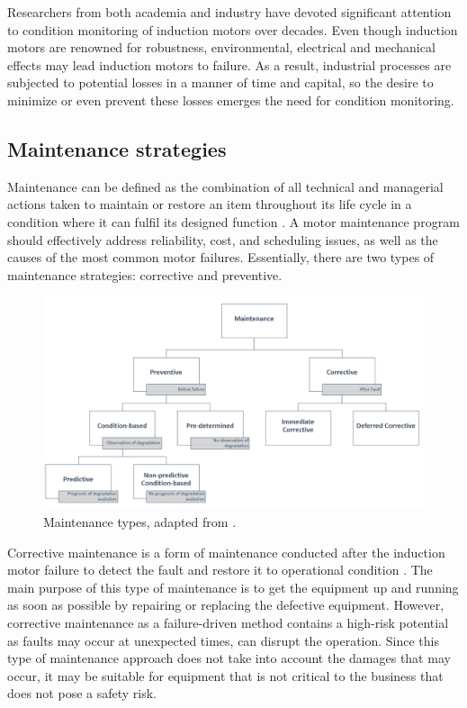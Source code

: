 Researchers from both academia and industry have devoted significant attention to condition monitoring of induction motors over decades. Even though induction motors are renowned for robustness, environmental, electrical and mechanical effects may lead induction motors to failure. As a result, industrial processes are subjected to potential losses in a manner of time and capital, so the desire to minimize or even prevent these losses emerges the need for condition monitoring. 
\pagebreak
\subsection{Maintenance strategies}

Maintenance can be defined as the combination of all technical and managerial actions taken to maintain or restore an item throughout its life cycle in a condition where it can fulfil its designed function \cite{en201713306}. A motor maintenance program should effectively address reliability, cost, and scheduling issues, as well as the causes of the most common motor failures. Essentially, there are two types of maintenance strategies: corrective and preventive. 

\begin{figure}[h]
	\centering
	\includegraphics[width=400pt,keepaspectratio=true]{./fig/maintenance.PNG}
	\caption{Maintenance types, adapted from \cite{en201713306}.}	
	\label{maintenance}
\end{figure}

Corrective maintenance is a form of maintenance conducted after the induction motor failure to detect the fault and restore it to operational condition \cite{en201713306}. The main purpose of this type of maintenance is to get the equipment up and running as soon as possible by repairing or replacing the defective equipment. However, corrective maintenance as a failure-driven method contains a high-risk potential as faults may occur at unexpected times, can disrupt the operation. Since this type of maintenance approach does not take into account the damages that may occur, it may be suitable for equipment that is not critical to the business that does not pose a safety risk.

